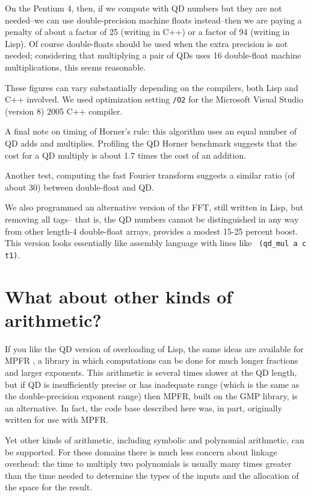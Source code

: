 \documentclass{article}
\begin{document}
On the Pentium 4, then, if we compute with QD numbers but they are not
needed--we can use double-precision machine floats instead--then we
are paying a penalty of about a factor of 25 (writing in C++) or a
factor of 94 (writing in Lisp). Of course double-floats should be
used when the extra precision is not needed; considering that multiplying
a pair of QDs uses 16 double-float machine multiplications, this
seems reasonable.

These figures can vary substantially depending on the compilers, both
Lisp and C++ involved. We used optimization setting {\tt /O2} for the Microsoft
Visual Studio (version 8) 2005 C++ compiler.  

A final note on timing of Horner's rule: this algorithm uses an equal number
of QD adds and multiplies.  Profiling the QD Horner benchmark suggests
that the cost for a QD multiply is about 1.7 times the cost of an addition.

Another test, computing the fast Fourier transform suggests a similar
ratio (of about 30) between double-float and QD.

We also programmed an alternative version of the FFT, still written in
Lisp, but removing all tags-- that is, the QD numbers cannot be
distinguished in any way from other length-4 double-float arrays,
provides a modest 15-25 percent boost. This version looks essentially
like assembly language with lines like {\verb| (qd_mul a c t1)|}.

\section{What about other kinds of arithmetic?}
If you like the QD version of overloading of Lisp, the same ideas are
available for MPFR \cite{mpfr}, a library in which computations can be
done for much longer fractions and larger exponents.  This arithmetic
is several times slower at the QD length, but if QD is insufficiently
precise or has inadequate range (which is the same as the
double-precision exponent range) then MPFR, built on the GMP library,
is an alternative. In fact, the code base described here was, in part,
originally written for use with MPFR.

Yet other kinds of arithmetic, including symbolic and polynomial arithmetic,
can be supported.  For these domains there is much less concern about linkage
overhead: the time to multiply two polynomials is usually many times greater
than the time needed to determine the types of the inputs and the allocation of
the space for the result.
\end{document}
